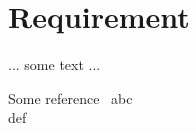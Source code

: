 \chapter{Requirement}
\label{sec:Requirement}


... some text ...

Some reference~
abc\cite{RFC3261}\\
def\cite{RFC3725}


